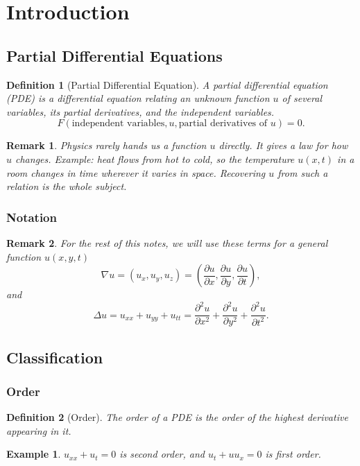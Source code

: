 \documentclass{article}
\newtheorem{definition}{Definition}
\newtheorem*{example}{Example}
\newtheorem{remark}{Remark}
\begin{document}
\section{Introduction}
\subsection{Partial Differential Equations}
\begin{definition}[Partial Differential Equation]
    A partial differential equation (PDE) is a differential equation relating an unknown function $u$ of several variables, its partial derivatives, and the independent variables.
    \[F(\text{independent variables}, u, \text{partial derivatives of }u) = 0.\]
\end{definition}
\begin{remark}
    Physics rarely hands us a function $u$ directly. It gives a law for how $u$ changes. Example: heat flows from hot to cold, so the temperature $u(x,t)$ in a room changes in time wherever it varies in space. Recovering $u$ from such a relation is the whole subject.
\end{remark}

\subsubsection{Notation}
\begin{remark}
    For the rest of this notes, we will use these terms for a general function $u(x,y,t)$
    \[\nabla u = (u_x,u_y,u_z) = \left(\frac{\partial u}{\partial x}, \frac{\partial u}{\partial y}, \frac{\partial u}{\partial t}\right),\]
    and
    \[\Delta u = u_{xx}+u_{yy}+u_{tt} = \frac{\partial^2 u}{\partial x^2} + \frac{\partial^2 u}{\partial y^2} + \frac{\partial^2 u}{\partial t^2}.\]
\end{remark}

\subsection{Classification}
\subsubsection{Order}
\begin{definition}[Order]
    The order of a PDE is the order of the highest derivative appearing in it.
\end{definition}
\begin{example}
    $u_{xx}+u_{t} = 0$ is second order, and $u_t + u u_x = 0$ is first order.
\end{example}
\end{document}
